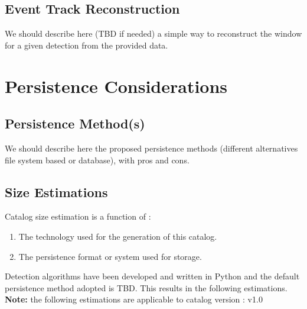 \documentclass[a4paper, 11pt]{article}
\newcommand{\dmVersion}{v1.0}
\begin{document}

\subsection{Event Track Reconstruction}

We should describe here (TBD if needed) a simple way to reconstruct the window for a given detection from the provided data.

\section{Persistence Considerations}
\label{sec:persist}
\subsection{Persistence Method(s)}

We should describe here the proposed persistence methods (different alternatives file system based or database), with pros and cons.

\subsection{Size Estimations}

Catalog size estimation is a function of :
\begin{enumerate}
\item The technology used for the generation of this catalog. 
\item The persistence format or system used for storage.
\end{enumerate}

Detection algorithms have been developed and written in Python and the default persistence method adopted is TBD. This results in the following estimations.
\newline
\newline
\textbf{Note:} the following estimations are applicable to catalog version : \dmVersion  
\newline
\newline
\end{document}
